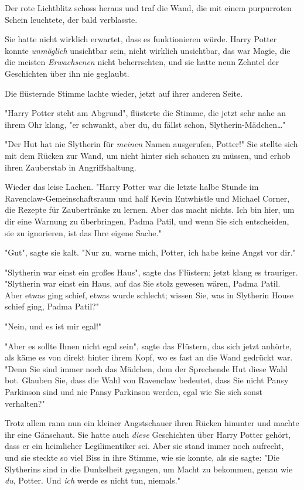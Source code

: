 {Der rote Lichtblitz schoss heraus und traf die Wand, die mit einem purpurroten Schein leuchtete, der bald verblasste.

Sie hatte nicht wirklich erwartet, dass es funktionieren würde. Harry Potter konnte \emph{unmöglich} unsichtbar sein, nicht wirklich unsichtbar, das war Magie, die die meisten \emph{Erwachsenen} nicht beherrschten, und sie hatte neun Zehntel der Geschichten über ihn nie geglaubt.

Die flüsternde Stimme lachte wieder, jetzt auf ihrer anderen Seite.

"Harry Potter steht am Abgrund", flüsterte die Stimme, die jetzt sehr nahe an ihrem Ohr klang, "er schwankt, aber du, du fällst schon, Slytherin-Mädchen…"

"Der Hut hat nie Slytherin für \emph{meinen} Namen ausgerufen, Potter!" Sie stellte sich mit dem Rücken zur Wand, um nicht hinter sich schauen zu müssen, und erhob ihren Zauberstab in Angriffshaltung.

Wieder das leise Lachen. "Harry Potter war die letzte halbe Stunde im Ravenclaw-Gemeinschaftsraum und half Kevin Entwhistle und Michael Corner, die Rezepte für Zaubertränke zu lernen. Aber das macht nichts. Ich bin hier, um dir eine Warnung zu überbringen, Padma Patil, und wenn Sie sich entscheiden, sie zu ignorieren, ist das Ihre eigene Sache."

"Gut", sagte sie kalt. "Nur zu, warne mich, Potter, ich habe keine Angst vor dir."

"Slytherin war einst ein großes Haus", sagte das Flüstern; jetzt klang es trauriger. "Slytherin war einst ein Haus, auf das Sie stolz gewesen wären, Padma Patil. Aber etwas ging schief, etwas wurde schlecht; wissen Sie, was in Slytherin House schief ging, Padma Patil?"

"Nein, und es ist mir egal!"

"Aber es sollte Ihnen nicht egal sein", sagte das Flüstern, das sich jetzt anhörte, als käme es von direkt hinter ihrem Kopf, wo es fast an die Wand gedrückt war. "Denn Sie sind immer noch das Mädchen, dem der Sprechende Hut diese Wahl bot. Glauben Sie, dass die Wahl von Ravenclaw bedeutet, dass Sie nicht Pansy Parkinson sind und nie Pansy Parkinson werden, egal wie Sie sich sonst verhalten?"

Trotz allem rann nun ein kleiner Angstschauer ihren Rücken hinunter und machte ihr eine Gänsehaut. Sie hatte auch \emph{diese} Geschichten über Harry Potter gehört, dass er ein heimlicher Legilimentiker sei. Aber sie stand immer noch aufrecht, und sie steckte so viel Biss in ihre Stimme, wie sie konnte, als sie sagte: "Die Slytherins sind in die Dunkelheit gegangen, um Macht zu bekommen, genau wie \emph{du}, Potter. Und \emph{ich} werde es nicht tun, niemals."

}
